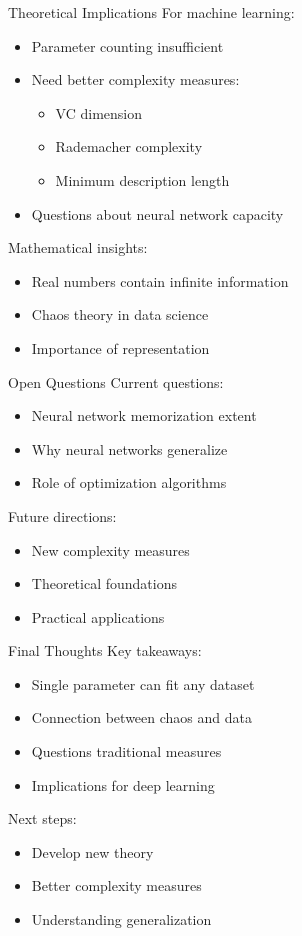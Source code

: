 \documentclass[10pt]{beamer}
\begin{document}
\begin{frame}{Theoretical Implications}
For machine learning:
\begin{itemize}
\item Parameter counting insufficient
\item Need better complexity measures:
    \begin{itemize}
    \item VC dimension
    \item Rademacher complexity
    \item Minimum description length
    \end{itemize}
\item Questions about neural network capacity
\end{itemize}

Mathematical insights:
\begin{itemize}
\item Real numbers contain infinite information
\item Chaos theory in data science
\item Importance of representation
\end{itemize}
\end{frame}

\begin{frame}{Open Questions}
Current questions:
\begin{itemize}
\item Neural network memorization extent
\item Why neural networks generalize
\item Role of optimization algorithms
\end{itemize}

Future directions:
\begin{itemize}
\item New complexity measures
\item Theoretical foundations
\item Practical applications
\end{itemize}
\end{frame}

\begin{frame}{Final Thoughts}
Key takeaways:
\begin{itemize}
\item Single parameter can fit any dataset
\item Connection between chaos and data
\item Questions traditional measures
\item Implications for deep learning
\end{itemize}

Next steps:
\begin{itemize}
\item Develop new theory
\item Better complexity measures
\item Understanding generalization
\end{itemize}

\end{frame}
\end{document}

